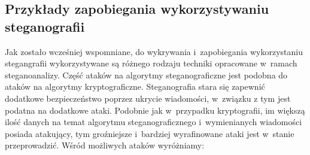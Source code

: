 \documentclass[a4paper, twoside, 12pt]{report}
\begin{document}
        \subsection{Przykłady zapobiegania wykorzystywaniu steganografii}
        Jak zostało wcześniej wspomniane, do wykrywania i~zapobiegania wykorzystaniu stegangrafii
        wykorzystywane są różnego rodzaju techniki opracowane w~ramach steganoanalizy.
        Część ataków na algorytmy steganograficzne jest podobna do ataków na
        algorytmy kryptograficzne. Steganografia stara się zapewnić dodatkowe bezpieczeństwo
        poprzez ukrycie wiadomości, w~związku z tym jest podatna na dodatkowe ataki.
        Podobnie jak w~przypadku kryptografii, im większą ilość danych na temat
        algorytmu steganograficznego i~wymienianych wiadomości posiada atakujący,
        tym groźniejsze i~bardziej wyrafinowane ataki jest w~stanie przeprowadzić.
        Wśród możliwych ataków wyróżniamy\cite{DISAPPEARINGCRYPTOEMBEDDINGMETDATA}:
\end{document}

